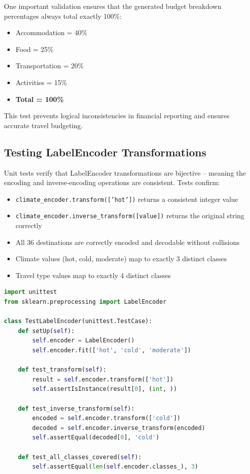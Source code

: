 One important validation ensures that the generated budget breakdown percentages always total exactly 100\%:

\begin{itemize}
    \item Accommodation = 40\%
    \item Food = 25\%
    \item Transportation = 20\%
    \item Activities = 15\%
    \item \textbf{Total = 100\%}
\end{itemize}

This test prevents logical inconsistencies in financial reporting and ensures accurate travel budgeting.

\subsection{Testing LabelEncoder Transformations}

Unit tests verify that LabelEncoder transformations are bijective -- meaning the encoding and inverse-encoding operations are consistent. Tests confirm:

\begin{itemize}
    \item \texttt{climate\_encoder.transform(['hot'])} returns a consistent integer value
    \item \texttt{climate\_encoder.inverse\_transform([value])} returns the original string correctly
    \item All 36 destinations are correctly encoded and decodable without collisions
    \item Climate values (hot, cold, moderate) map to exactly 3 distinct classes
    \item Travel type values map to exactly 4 distinct classes
\end{itemize}

\begin{lstlisting}[language=Python, caption={Unit Test for LabelEncoder}, label={lst:encoder-test}]
import unittest
from sklearn.preprocessing import LabelEncoder

class TestLabelEncoder(unittest.TestCase):
    def setUp(self):
        self.encoder = LabelEncoder()
        self.encoder.fit(['hot', 'cold', 'moderate'])

    def test_transform(self):
        result = self.encoder.transform(['hot'])
        self.assertIsInstance(result[0], (int, ))

    def test_inverse_transform(self):
        encoded = self.encoder.transform(['cold'])
        decoded = self.encoder.inverse_transform(encoded)
        self.assertEqual(decoded[0], 'cold')

    def test_all_classes_covered(self):
        self.assertEqual(len(self.encoder.classes_), 3)
\end{lstlisting}

